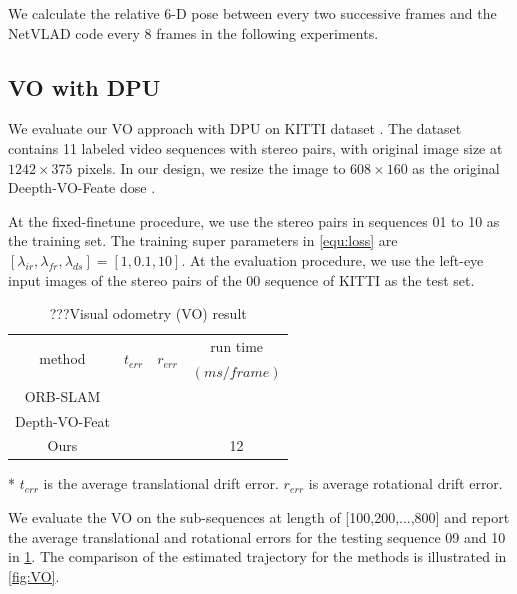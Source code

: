 We calculate the relative 6-D pose between every two successive frames and the NetVLAD code every $8$ frames in the following experiments.

\subsection{VO with DPU}

We evaluate our VO approach with DPU on KITTI dataset \cite{geiger2013vision}. The dataset contains 11 labeled video sequences with stereo pairs, with original image size at $1242 \times 375$ pixels. In our design, we resize the image to $608 \times 160$ as the original Deepth-VO-Feate dose \cite{Zhan:2018e92}.

At the fixed-finetune procedure, we use the stereo pairs in sequences 01 to 10 as the training set. The training  super parameters in \cref{equ:loss} are $[\lambda_{ir},\lambda_{fr},\lambda_{ds}] = [1,0.1,10]$. At the evaluation procedure, we use the left-eye input images of the stereo pairs of the 00 sequence of KITTI as the test set.


\begin{table}[ht]
    \centering
    \caption{???Visual odometry (VO) result}
    \footnotesize
    \begin{threeparttable}
\begin{tabular}{|c|c|c|c|}
  \hline
  \multirow{2}[2]{*}{method} & \multirow{2}[2]{*}{$t_{err}$} & \multirow{2}[2]{*}{$r_{err}$} & run time  \bigstrut[t]\\
        &       &       & $(ms/frame)$ \bigstrut[b]\\
  \hline
  ORB-SLAM  &       &       &  \bigstrut\\
  \hline
  Depth-VO-Feat &       &       &  \bigstrut\\
  \hline
  Ours  &       &       & 12 \bigstrut\\
  \hline
  \end{tabular}%
  
  \begin{tablenotes}
        \item[*] $t_{err}$ is the average translational drift error. $r_{err}$ is average rotational drift error.
        \end{tablenotes}
      \end{threeparttable}
    \label{tab:VO}%
  \end{table}%

  We evaluate the VO on the sub-sequences at length of [100,200,...,800] and report the average translational and rotational errors for the testing sequence 09 and 10 in \cref{tab:VO}.  The comparison of the estimated trajectory for the methods is illustrated in \cref{fig:VO}.


